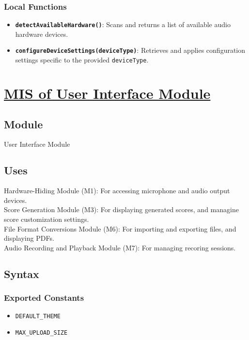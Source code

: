 \documentclass[12pt, titlepage]{article}
\begin{document}
\subsubsection{Local Functions}
\begin{itemize}
    \item \textbf{\texttt{detectAvailableHardware()}}: Scans and returns a list of available audio hardware devices.
    \item \textbf{\texttt{configureDeviceSettings(deviceType)}}: Retrieves and applies configuration settings specific to the provided \texttt{deviceType}.
\end{itemize}


\section{\hyperref[mUI]{MIS of User Interface Module}} \label{M2}  

\subsection{Module}  
User Interface Module  

\subsection{Uses}  
Hardware-Hiding Module (M1): For accessing microphone and audio output devices. \\
Score Generation Module (M3): For displaying generated scores, and managine score customization settings. \\
File Format Conversions Module (M6): For importing and exporting files, and displaying PDFs. \\
Audio Recording and Playback Module (M7): For managing recoring sessions. \\

\subsection{Syntax}  

\subsubsection{Exported Constants}  
\begin{itemize}
    \item \texttt{DEFAULT\_THEME}  
    \item \texttt{MAX\_UPLOAD\_SIZE}  
\end{itemize}  
\end{document}
